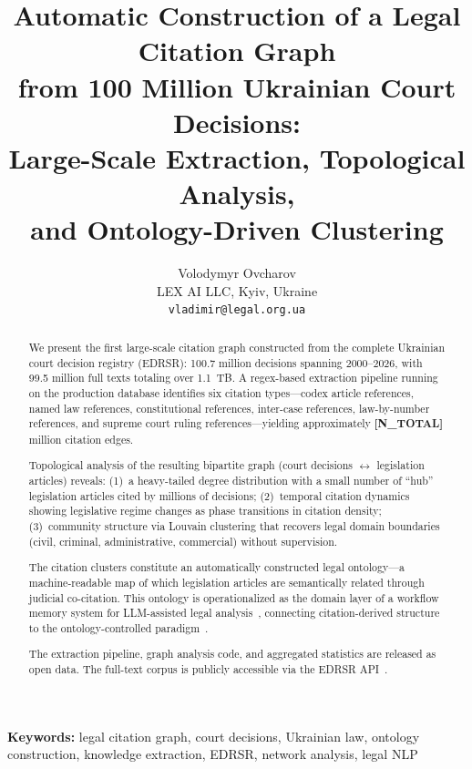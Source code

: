 \documentclass[11pt]{article}
\title{Automatic Construction of a Legal Citation Graph\\from 100 Million Ukrainian Court Decisions:\\Large-Scale Extraction, Topological Analysis,\\and Ontology-Driven Clustering}
\author{
  Volodymyr Ovcharov \\[6pt]
  LEX AI LLC, Kyiv, Ukraine \\[4pt]
  \texttt{vladimir@legal.org.ua}
}
\date{}
\begin{document}
\maketitle

\begin{abstract}

We present the first large-scale citation graph constructed from the complete Ukrainian court decision registry (EDRSR): 100.7 million decisions spanning 2000--2026, with 99.5 million full texts totaling over 1.1~TB.
A regex-based extraction pipeline running on the production database identifies six citation types---codex article references, named law references, constitutional references, inter-case references, law-by-number references, and supreme court ruling references---yielding approximately \textbf{[N\_TOTAL]} million citation edges.

Topological analysis of the resulting bipartite graph (court decisions $\leftrightarrow$ legislation articles) reveals: (1)~a heavy-tailed degree distribution with a small number of ``hub'' legislation articles cited by millions of decisions; (2)~temporal citation dynamics showing legislative regime changes as phase transitions in citation density; (3)~community structure via Louvain clustering that recovers legal domain boundaries (civil, criminal, administrative, commercial) without supervision.

The citation clusters constitute an automatically constructed legal ontology---a machine-readable map of which legislation articles are semantically related through judicial co-citation.
This ontology is operationalized as the domain layer of a workflow memory system for LLM-assisted legal analysis~\citep{ovcharov2026workflowmemory}, connecting citation-derived structure to the ontology-controlled paradigm~\citep{palagin2006architecture,palagin2023ontochatgpt}.

The extraction pipeline, graph analysis code, and aggregated statistics are released as open data.
The full-text corpus is publicly accessible via the EDRSR API~\citep{edrsr2024}.

\end{abstract}

\medskip
\noindent\textbf{Keywords:} legal citation graph, court decisions, Ukrainian law, ontology construction, knowledge extraction, EDRSR, network analysis, legal NLP
\end{document}
